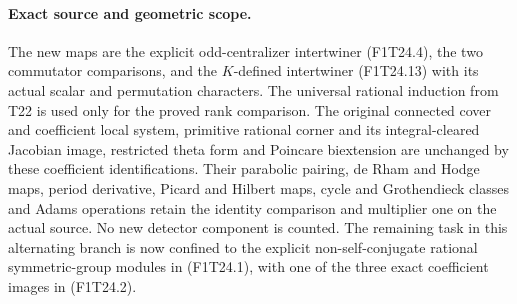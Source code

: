 \paragraph{Exact source and geometric scope.}
The new maps are the explicit odd-centralizer
intertwiner (F1T24.4), the two commutator
comparisons, and the \(K\)-defined intertwiner
(F1T24.13) with its actual scalar and permutation
characters. The universal rational induction
from T22 is used only for the proved rank
comparison. The original connected cover and
coefficient local system, primitive rational
corner and its integral-cleared Jacobian image,
restricted theta form and Poincare biextension
are unchanged by these coefficient
identifications. Their parabolic pairing,
de Rham and Hodge maps, period derivative,
Picard and Hilbert maps, cycle and
Grothendieck classes and Adams operations
retain the identity comparison and multiplier
one on the actual source. No new detector
component is counted. The remaining task in
this alternating branch is now confined to
the explicit non-self-conjugate rational
symmetric-group modules in (F1T24.1), with
one of the three exact coefficient images
in (F1T24.2).
